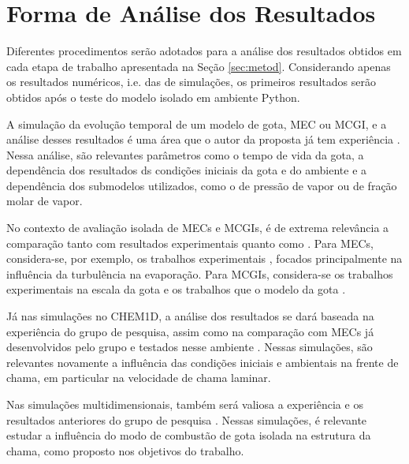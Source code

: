 
\section{Forma de Análise dos Resultados} \label{sec:resultados}

Diferentes procedimentos serão adotados para a análise dos resultados obtidos em cada etapa de trabalho apresentada na Seção \ref{sec:metod}.
Considerando apenas os resultados numéricos, i.e. das de simulações, os primeiros resultados serão obtidos após o teste do modelo isolado em ambiente Python. 

A simulação da evolução temporal de um modelo de gota, MEC ou MCGI, e a análise desses resultados é uma área que o autor da proposta já tem experiência \cite{HenningsJ2024MT}. 
Nessa análise, são relevantes parâmetros como o tempo de vida da gota, a dependência dos resultados ds condições iniciais da gota e do ambiente e a dependência dos submodelos utilizados, como o de pressão de vapor ou de fração molar de vapor.

No contexto de avaliação isolada de MECs e MCGIs, é de extrema relevância a comparação tanto com resultados experimentais quanto como .
Para MECs, considera-se, por exemplo, os trabalhos experimentais \cite{BiroukM2006,PatelU2019,KayaEyiceD2024,ArabkhalajA2024,MaquaC2008}, focados principalmente na influência da turbulência na evaporação.
Para MCGIs, considera-se os trabalhos experimentais na escala da gota \cite{ChoS1990SCI,CandelS1999,ChenG1996CF,Xu2002,BiroukM2000,CuociA2005,SetyawanH2015} e os trabalhos que  o modelo da gota \cite{Stauch2006,CuociA2005,ChoS1990SCI,KazakovA2003CF,MarcheseA1996CF,WangW2024}.

Já nas simulações no CHEM1D, a análise dos resultados se dará baseada na experiência do grupo de pesquisa, assim como na comparação com MECs já desenvolvidos pelo grupo e testados nesse ambiente \cite{SacomanoF2018CTM,SacomanoF2019IJHMT,SacomanoF2021Fluids,SacomanoF2024CF,SacomanoF2025CF}.
Nessas simulações, são relevantes novamente a influência das condições iniciais e ambientais na frente de chama, em particular na velocidade de chama laminar.

Nas simulações multidimensionais, também será valiosa a experiência e os resultados anteriores do grupo de pesquisa \cite{SacomanoF2017CF,SacomanoF2020CF}.
Nessas simulações, é relevante estudar a influência do modo de combustão de gota isolada na estrutura da chama, como proposto nos objetivos do trabalho.